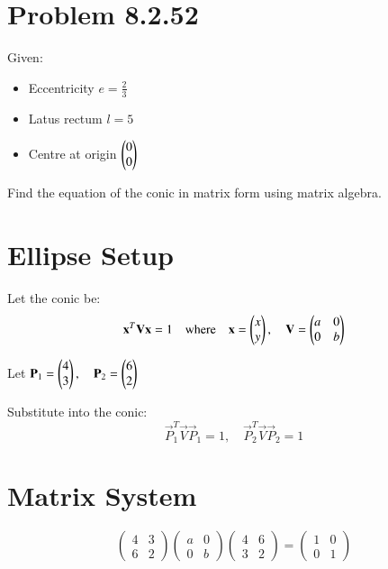 \documentclass[journal]{IEEEtran}
\begin{document}

\vspace{3cm}

\section*{\large\textbf{Problem 8.2.52}}
\vspace{0.5cm}

Given:
\begin{itemize}
  \item Eccentricity \( e = \frac{2}{3} \)
  \item Latus rectum \( l = 5 \)
  \item Centre at origin \( \begin{pmatrix}0 \\ 0\end{pmatrix} \)
\end{itemize}
Find the equation of the conic in matrix form using matrix algebra.

\section*{\large\textbf{Ellipse Setup}}
\vspace{0.5cm}

Let the conic be:
\[
\mathbf{x}^T \mathbf{V} \mathbf{x} = 1
\quad \text{where} \quad
\mathbf{x} = \begin{pmatrix}x \\ y\end{pmatrix}, \quad
\mathbf{V} = \begin{pmatrix}a & 0 \\ 0 & b\end{pmatrix}
\]

Let \( \mathbf{P}_1 = \begin{pmatrix}4 \\ 3\end{pmatrix}, \quad \mathbf{P}_2 = \begin{pmatrix}6 \\ 2\end{pmatrix} \)

Substitute into the conic:
\[
\vec{P}_1^T \vec{V} \vec{P}_1 = 1, \quad
\vec{P}_2^T \vec{V} \vec{P}_2 = 1
\]

\section*{\large\textbf{Matrix System}}
\vspace{0.5cm}

\[
\begin{pmatrix}
4 & 3 \\
6 & 2
\end{pmatrix}
\begin{pmatrix}
a & 0 \\
0 & b
\end{pmatrix}
\begin{pmatrix}
4 & 6 \\
3 & 2
\end{pmatrix}
=
\begin{pmatrix}
1 & 0 \\
0 & 1
\end{pmatrix}
\]
\end{document}

